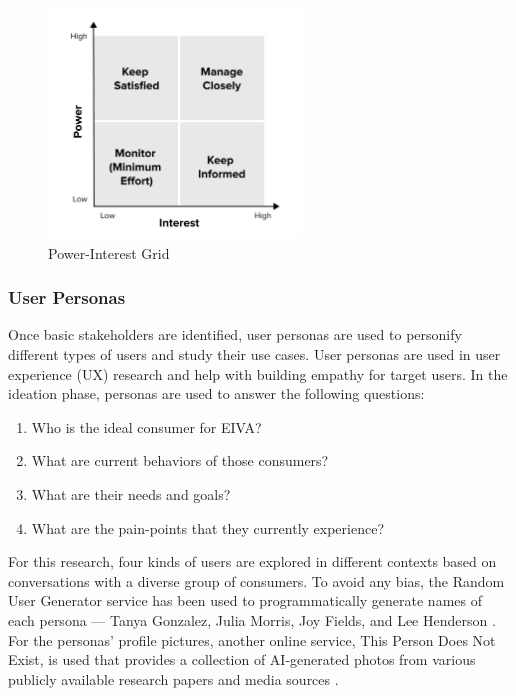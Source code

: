 \documentclass{article}
\begin{document}
\begin{figure}[h!]
	\centering
	\includegraphics[width=0.6\textwidth]{power-interest.jpg}
	\caption{Power-Interest Grid}
	\label{fig:checkbox}
\end{figure}

\subsubsection{User Personas}

Once basic stakeholders are identified, user personas are used to personify different types of users and study their use cases. User personas are used in user experience (UX) research and help with building empathy for target users. In the ideation phase, personas are used to answer the following questions:

\begin{enumerate}
	\item Who is the ideal consumer for EIVA?
	\item What are current behaviors of those consumers?
	\item What are their needs and goals?
	\item What are the pain-points that they currently experience?
\end{enumerate}

For this research, four kinds of users are explored in different contexts based on conversations with a diverse group of consumers. To avoid any bias, the Random User Generator service has been used to programmatically generate names of each persona --- Tanya Gonzalez, Julia Morris, Joy Fields, and Lee Henderson \cite{noauthor_random_nodate}. For the personas' profile pictures, another online service, This Person Does Not Exist, is used that provides a collection of AI-generated photos from various publicly available research papers and media sources \cite{noauthor_this_nodate}.
\end{document}
